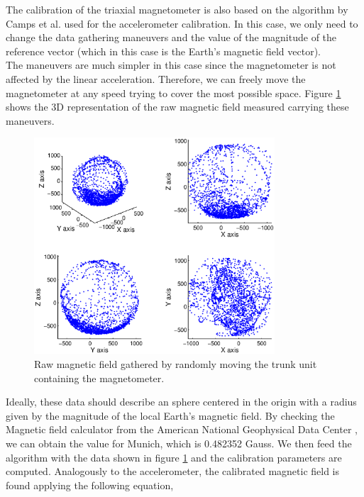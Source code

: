 \indent \indent The calibration of the triaxial magnetometer is also based on the algorithm by Camps et al. used for the accelerometer calibration. In this case, we only need to change the data gathering maneuvers and the value of the magnitude of the reference vector (which in this case is the Earth's magnetic field vector).\\

\indent The maneuvers are much simpler in this case since the magnetometer is not affected by the linear acceleration. Therefore, we can freely move the magnetometer at any speed trying to cover the most possible space. Figure \ref{fig:mag_raw_3D} shows the 3D representation of the raw magnetic field measured carrying these maneuvers. 

\begin{figure}[t]
\centering
\includegraphics[width=0.8\textwidth]{figures/trunk_rawMag3D_4POV.eps}
\caption{Raw magnetic field gathered by randomly moving the trunk unit containing the magnetometer.}
\label{fig:mag_raw_3D}
\end{figure}

Ideally, these data should describe an sphere centered in the origin with a radius given by the magnitude of the local Earth's magnetic field. By checking the Magnetic field calculator from the American National Geophysical Data Center \cite{center_ngdc}, we can obtain the value for Munich, which is 0.482352 Gauss. We then feed the algorithm with the data shown in figure \ref{fig:mag_raw_3D} and the calibration parameters are computed. Analogously to the accelerometer, the calibrated magnetic field is found applying the following equation,

